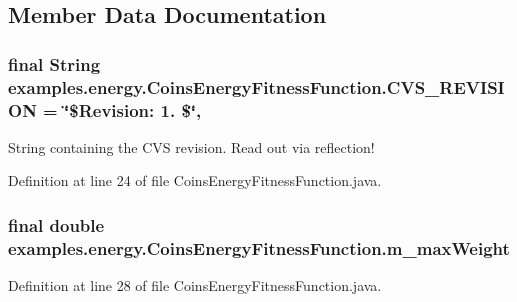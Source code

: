 \subsection{Member Data Documentation}
\hypertarget{classexamples_1_1energy_1_1_coins_energy_fitness_function_a3389a0536829e5063a1e0a311a865396}{
\subsubsection[{C\-V\-S\-\_\-\-R\-E\-V\-I\-S\-I\-O\-N}]{\setlength{\rightskip}{0pt plus 5cm}final String examples.\-energy.\-Coins\-Energy\-Fitness\-Function.\-C\-V\-S\-\_\-\-R\-E\-V\-I\-S\-I\-O\-N = \char`\"{}\$Revision\-: 1. \$\char`\"{}\hspace{0.3cm}{\ttfamily [static]}, {\ttfamily [private]}}}\label{classexamples_1_1energy_1_1_coins_energy_fitness_function_a3389a0536829e5063a1e0a311a865396}
String containing the C\-V\-S revision. Read out via reflection! 

Definition at line 24 of file Coins\-Energy\-Fitness\-Function.\-java.

\hypertarget{classexamples_1_1energy_1_1_coins_energy_fitness_function_a079206bf03780d52517c7407ced880fe}{
\subsubsection[{m\-\_\-max\-Weight}]{\setlength{\rightskip}{0pt plus 5cm}final double examples.\-energy.\-Coins\-Energy\-Fitness\-Function.\-m\-\_\-max\-Weight\hspace{0.3cm}{\ttfamily [private]}}}\label{classexamples_1_1energy_1_1_coins_energy_fitness_function_a079206bf03780d52517c7407ced880fe}


Definition at line 28 of file Coins\-Energy\-Fitness\-Function.\-java.



